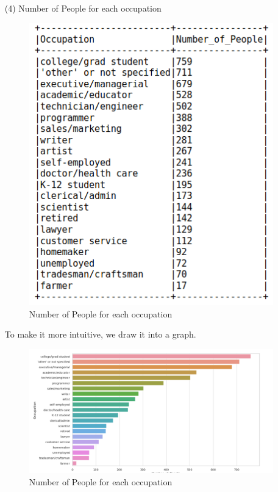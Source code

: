 \documentclass[two column]{article}
\begin{document}
\begin{itemize}
\item[(4)] Number of People for each occupation

\begin{figure}[H]
\centering
\caption{Number of People for each occupation}
\includegraphics[width = 0.95\linewidth]{career-distribution1.png}
\end{figure}

\par To make it more intuitive, we draw it into a graph.
\begin{figure}[H]
\centering
\caption{Number of People for each occupation}
\includegraphics[width = 0.95\linewidth]{career-distribution2.png}
\end{figure}


\end{itemize}
\end{document}
